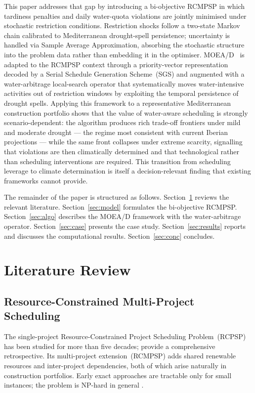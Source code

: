 \documentclass[12pt,a4paper]{article}
\begin{document}
This paper addresses that gap by introducing a bi-objective RCMPSP in which
tardiness penalties and daily water-quota violations are jointly minimised under
stochastic restriction conditions.  Restriction shocks follow a two-state Markov
chain calibrated to Mediterranean drought-spell persistence; uncertainty is handled
via Sample Average Approximation, absorbing the stochastic structure into the problem
data rather than embedding it in the optimiser.  MOEA/D~\citep{Zhang2007} is adapted
to the RCMPSP context through a priority-vector representation decoded by a Serial
Schedule Generation Scheme~(SGS) and augmented with a water-arbitrage local-search
operator that systematically moves water-intensive activities out of restriction
windows by exploiting the temporal persistence of drought spells.  Applying this
framework to a representative Mediterranean construction portfolio shows that the value
of water-aware scheduling is strongly scenario-dependent: the algorithm produces rich
trade-off frontiers under mild and moderate drought — the regime most consistent with
current Iberian projections — while the same front collapses under extreme scarcity,
signalling that violations are then climatically determined and that technological
rather than scheduling interventions are required.  This transition from scheduling
leverage to climate determination is itself a decision-relevant finding that existing
frameworks cannot provide.

The remainder of the paper is structured as follows.
Section~\ref{sec:lit} reviews the relevant literature.
Section~\ref{sec:model} formulates the bi-objective RCMPSP.
Section~\ref{sec:algo} describes the MOEA/D framework with the water-arbitrage
operator.
Section~\ref{sec:case} presents the case study.
Section~\ref{sec:results} reports and discusses the computational results.
Section~\ref{sec:conc} concludes.

\section{Literature Review}
\label{sec:lit}

\subsection{Resource-Constrained Multi-Project Scheduling}
\label{sec:lit:rcmpsp}

The single-project Resource-Constrained Project Scheduling Problem~(RCPSP) has been
studied for more than five decades; \citet{Artigues2026} provide a comprehensive
retrospective.  Its multi-project extension~(RCMPSP) adds shared renewable resources
and inter-project dependencies, both of which arise naturally in construction
portfolios.  Early exact approaches \citep{Pritsker1969} are tractable only for
small instances; the problem is NP-hard in general \citep{Blazewicz1983}.
\end{document}
